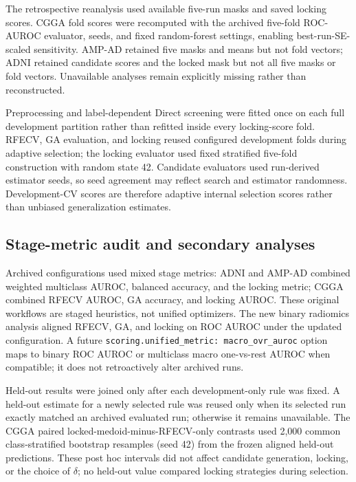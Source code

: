 The retrospective reanalysis used available five-run masks and saved locking scores. CGGA fold scores were recomputed with the archived five-fold ROC-AUROC evaluator, seeds, and fixed random-forest settings, enabling best-run-SE-scaled sensitivity. AMP-AD retained five masks and means but not fold vectors; ADNI retained candidate scores and the locked mask but not all five masks or fold vectors. Unavailable analyses remain explicitly missing rather than reconstructed.

Preprocessing and label-dependent Direct screening were fitted once on each full development partition rather than refitted inside every locking-score fold. RFECV, GA evaluation, and locking reused configured development folds during adaptive selection; the locking evaluator used fixed stratified five-fold construction with random state 42. Candidate evaluators used run-derived estimator seeds, so seed agreement may reflect search and estimator randomness. Development-CV scores are therefore adaptive internal selection scores rather than unbiased generalization estimates.

\subsection{Stage-metric audit and secondary analyses}

Archived configurations used mixed stage metrics: ADNI and AMP-AD combined weighted multiclass AUROC, balanced accuracy, and the locking metric; CGGA combined RFECV AUROC, GA accuracy, and locking AUROC. These original workflows are staged heuristics, not unified optimizers. The new binary radiomics analysis aligned RFECV, GA, and locking on ROC AUROC under the updated configuration. A future \texttt{scoring.unified\_metric: macro\_ovr\_auroc} option maps to binary ROC AUROC or multiclass macro one-vs-rest AUROC when compatible; it does not retroactively alter archived runs.

Held-out results were joined only after each development-only rule was fixed. A held-out estimate for a newly selected rule was reused only when its selected run exactly matched an archived evaluated run; otherwise it remains unavailable. The CGGA paired locked-medoid-minus-RFECV-only contrasts used 2,000 common class-stratified bootstrap resamples (seed 42) from the frozen aligned held-out predictions. These post hoc intervals did not affect candidate generation, locking, or the choice of \(\delta\); no held-out value compared locking strategies during selection.

